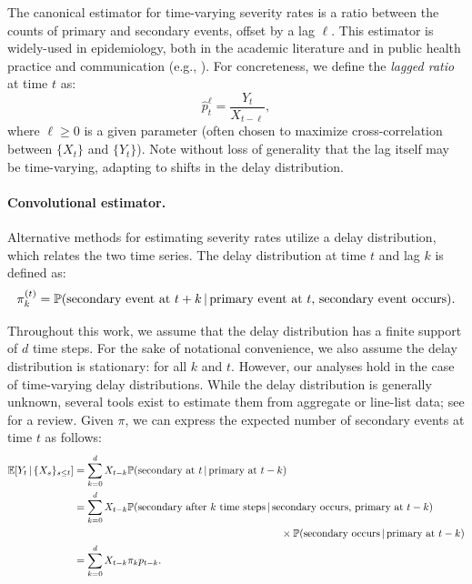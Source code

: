 \documentclass{article}
\renewcommand{\hat}{\widehat} %
\newcommand{\given}{\, \vert \,}
\begin{document}
The canonical estimator for time-varying severity rates is a ratio between
the counts of primary and secondary events, offset by a lag $\ell$. This
estimator is widely-used in epidemiology, both in the academic literature and in 
public health practice and communication (e.g., \citealp{wsj, atlantic,
  yuan2020monitoring, timevar_ifr, thomas2021estimating, horita2022global,
  LIU2023100350, germany}). For concreteness, we define the \emph{lagged ratio} 
at time $t$ as:   
\begin{equation}
\label{eq:lagged}
\hat{p}_t^\ell = \frac{Y_t}{X_{t-\ell}},
\end{equation}
where $\ell \geq 0$ is a given parameter (often chosen to maximize
cross-correlation between $\{X_t\}$ and $\{Y_t\}$). 
Note without loss of generality that the lag itself may be time-varying, adapting to shifts in the delay distribution.

\paragraph{Convolutional estimator.} 

Alternative methods for estimating severity rates utilize a delay distribution,
which relates the two time series. The delay distribution at time $t$ and lag
$k$ is defined as: 
\[
\pi_k^{(t)} = \P(\text{secondary event at $t+k$} \given \text{primary event at
  $t$, secondary event occurs}).  
\]

Throughout this work, we assume that the delay distribution has a finite support
of $d$ time steps. 
For the sake of notational convenience, we also assume the delay distribution is stationary:
 for all $k$ and $t$. 
However, our analyses hold in the case of time-varying delay distributions.
While the delay distribution is generally unknown,
several tools exist to estimate them from aggregate or line-list data; see
\citealp{delay_distrs} for a review. Given $\pi$, we can express the
expected number of secondary events at time $t$ as follows: 
\begin{align}
\E[Y_t \given \{X_s\}_{s\leq t}]
&= \sum_{k=0}^d X_{t-k} \P(\text{secondary at $t$} \given \text{primary at
  $t-k$}) \nonumber \\   
&= \sum_{k=0}^d X_{t-k} \P(\text{secondary after $k$ time steps} \given
  \text{secondary occurs, primary at $t-k$}) \nonumber \\
&\hspace{200pt} \times\P(\text{secondary occurs} \given\text{primary at $t-k$})
  \nonumber \\  
\label{eq:model}
&= \sum_{k=0}^d X_{t-k} \pi_k p_{t-k}.
\end{align}
\end{document}
